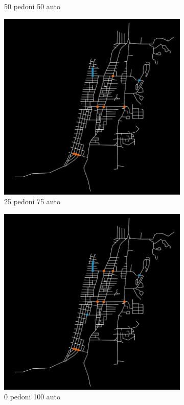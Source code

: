 \begin{figure}
\begin{subfigure}{0.475\textwidth}
        \caption{50 pedoni 50 auto}
    \end{subfigure}
    \begin{subfigure}{0.475\textwidth}
        \centering
        \includegraphics[width=\textwidth]{images/analisi/comparison-base-in-out-flow-25-75-car.png}
        \caption{25 pedoni 75 auto}
    \end{subfigure}
    \begin{subfigure}{0.475\textwidth}
        \centering
        \includegraphics[width=\textwidth]{images/analisi/comparison-base-in-out-flow-0-100-car.png}
        \caption{0 pedoni 100 auto}
    \end{subfigure}
    \caption{}
    \label{fig:analisi-comparison-in-out-flow-map-base}
\end{figure}

